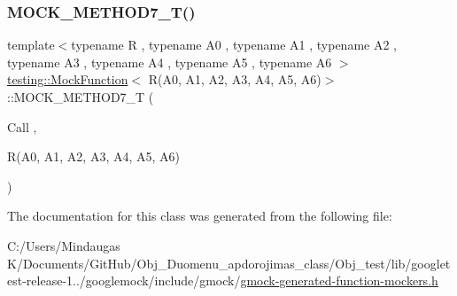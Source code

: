 \mbox{\label{classtesting_1_1_mock_function_3_01_r_07_a0_00_01_a1_00_01_a2_00_01_a3_00_01_a4_00_01_a5_00_01_a6_08_4_a965d96b3e212c5bd0391302fcee943d6}} 
\subsubsection{\texorpdfstring{MOCK\_METHOD7\_T()}{MOCK\_METHOD7\_T()}}
{\footnotesize\ttfamily template$<$typename R , typename A0 , typename A1 , typename A2 , typename A3 , typename A4 , typename A5 , typename A6 $>$ \\
\mbox{\hyperlink{classtesting_1_1_mock_function}{testing\+::\+Mock\+Function}}$<$ R(A0, A1, A2, A3, A4, A5, A6)$>$\+::M\+O\+C\+K\+\_\+\+M\+E\+T\+H\+O\+D7\+\_\+T (\begin{DoxyParamCaption}\item[{Call}]{,  }\item[{R(A0, A1, A2, A3, A4, A5, A6)}]{ }\end{DoxyParamCaption})}



The documentation for this class was generated from the following file\+:\begin{DoxyCompactItemize}
\item 
C\+:/\+Users/\+Mindaugas K/\+Documents/\+Git\+Hub/\+Obj\+\_\+\+Duomenu\+\_\+apdorojimas\+\_\+class/\+Obj\+\_\+test/lib/googletest-\/release-\/1../googlemock/include/gmock/\mbox{\hyperlink{_obj__test_2lib_2googletest-release-1_88_81_2googlemock_2include_2gmock_2gmock-generated-function-mockers_8h}{gmock-\/generated-\/function-\/mockers.\+h}}\end{DoxyCompactItemize}
